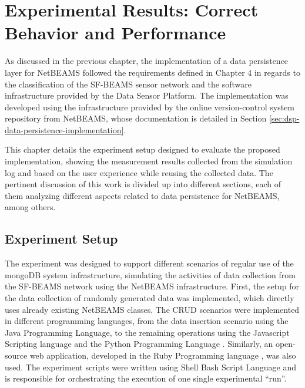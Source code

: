 

\chapter{Experimental Results: Correct Behavior and Performance}

As discussed in the previous chapter, the implementation of a data persistence
layer for NetBEAMS followed the requirements defined in Chapter 4 in regards
to the classification of the SF-BEAMS sensor network and the software
infrastructure provided by the Data Sensor Platform. The implementation was
developed using the infrastructure provided by the online version-control
system repository from NetBEAMS, whose documentation is detailed in Section
\ref{sec:dsp-data-persistence-implementation}.

This chapter details the experiment setup designed to evaluate the
proposed implementation, showing the measurement results collected from the
simulation log and based on the user experience while reusing the collected
data. The pertinent discussion of this work is divided up into different
sections, each of them analyzing different aspects related to data persistence
for NetBEAMS, among others.

\section{Experiment Setup}

The experiment was designed to support different scenarios of regular use of
the mongoDB system infrastructure, simulating the activities of data collection
from the SF-BEAMS network using the NetBEAMS infrastructure. First, the setup
for the data collection of randomly generated data was implemented, which
directly uses already existing NetBEAMS classes. The CRUD scenarios were
implemented in different programming languages, from the data insertion
scenario using the Java Programming Language, to the remaining operations using
the Javascript Scripting language \cite{javascript} and the Python Programming
Language \cite{python}. Similarly, an open-source web application, developed
in the Ruby Programming language \cite{ruby}, was also used. The experiment
scripts were written using Shell Bash Script Language \cite{bashshell} and is
responsible for orchestrating the execution of one single experimental ``run''.

